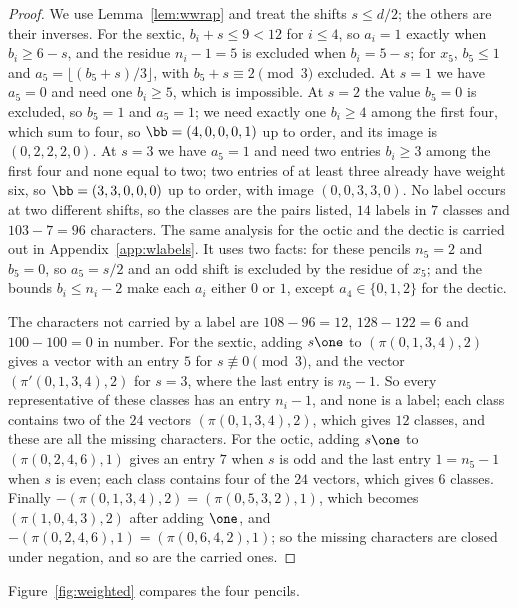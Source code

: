 \begin{proof}
We use Lemma~\ref{lem:wwrap} and treat the shifts $s\le d/2$; the others
are their inverses. For the sextic, $b_i+s\le9<12$ for $i\le4$, so
$a_i=1$ exactly when $b_i\ge6-s$, and the residue $n_i-1=5$ is excluded
when $b_i=5-s$; for $x_5$, $b_5\le1$ and $a_5=\lfloor(b_5+s)/3\rfloor$,
with $b_5+s\equiv2\pmod3$ excluded. At $s=1$ we have $a_5=0$ and need one
$b_i\ge5$, which is impossible. At $s=2$ the value $b_5=0$ is excluded, so
$b_5=1$ and $a_5=1$; we need exactly one $b_i\ge4$ among the first four,
which sum to four, so $\bb=(4,0,0,0,1)$ up to order, and its image is
$(0,2,2,2,0)$. At $s=3$ we have $a_5=1$ and need two entries $b_i\ge3$
among the first four and none equal to two; two entries of at least three
already have weight six, so $\bb=(3,3,0,0,0)$ up to order, with image
$(0,0,3,3,0)$. No label occurs at two different shifts, so the classes are
the pairs listed, $14$ labels in $7$ classes and $103-7=96$ characters.
The same analysis for the octic and the dectic is carried out in
Appendix~\ref{app:wlabels}. It uses two facts: for these pencils $n_5=2$
and $b_5=0$, so $a_5=s/2$ and an odd shift is excluded by the residue of
$x_5$; and the bounds $b_i\le n_i-2$ make each $a_i$ either $0$ or $1$,
except $a_4\in\{0,1,2\}$ for the dectic.

The characters not carried by a label are $108-96=12$, $128-122=6$ and
$100-100=0$ in number. For the sextic, adding $s\one$ to
$(\pi(0,1,3,4),2)$ gives a vector with an entry $5$ for $s\not\equiv0
\pmod3$, and the vector $(\pi'(0,1,3,4),2)$ for $s=3$, where the last entry
is $n_5-1$. So every representative of these classes has an entry $n_i-1$,
and none is a label; each class contains two of the $24$ vectors
$(\pi(0,1,3,4),2)$, which gives $12$ classes, and these are all the missing
characters. For the octic, adding $s\one$ to $(\pi(0,2,4,6),1)$ gives an
entry $7$ when $s$ is odd and the last entry $1=n_5-1$ when $s$ is even;
each class contains four of the $24$ vectors, which gives $6$ classes.
Finally $-(\pi(0,1,3,4),2)=(\pi(0,5,3,2),1)$, which becomes
$(\pi(1,0,4,3),2)$ after adding $\one$, and $-(\pi(0,2,4,6),1)=
(\pi(0,6,4,2),1)$; so the missing characters are closed under negation,
and so are the carried ones.
\end{proof}

Figure~\ref{fig:weighted} compares the four pencils.

